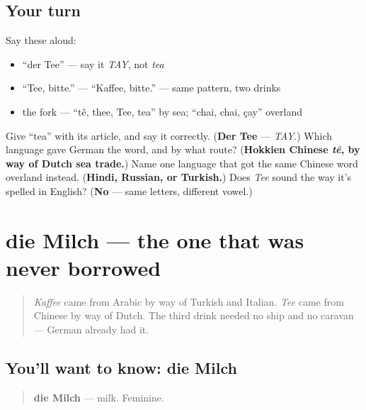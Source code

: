 \subsection*{Your turn}
Say these aloud:

\begin{itemize}
\raggedright
  \item \textquotedblleft{}der Tee\textquotedblright{} — say it \emph{TAY}, not \emph{tea}
  \item \textquotedblleft{}Tee, bitte.\textquotedblright{} — \textquotedblleft{}Kaffee, bitte.\textquotedblright{} — same pattern, two drinks
  \item the fork — \textquotedblleft{}tê, thee, Tee, tea\textquotedblright{} by sea; \textquotedblleft{}chai, chai, çay\textquotedblright{} overland
\end{itemize}

\begin{tcolorbox}[breakable,colback=teal!4,colframe=teal!35!black,title={Before you move on}]
Give \textquotedblleft{}tea\textquotedblright{} with its article, and say it correctly. (\textbf{Der Tee} — \emph{TAY}.) Which language gave German the word, and by what route? (\textbf{Hokkien Chinese \emph{tê}, by way of Dutch sea trade.}) Name one language that got the same Chinese word overland instead. (\textbf{Hindi, Russian, or Turkish.}) Does \emph{Tee} sound the way it's spelled in English? (\textbf{No} — same letters, different vowel.)
\end{tcolorbox}
\section[die Milch]{die Milch — the one that was never borrowed}

\label{lesson:GE-C28-milch}



\begin{quote}
\emph{Kaffee} came from Arabic by way of Turkish and Italian. \emph{Tee} came from Chinese by way of Dutch. The third drink needed no ship and no caravan — German already had it.
\end{quote}

\subsection*{You'll want to know: die Milch}
\begin{quote}
\textbf{die Milch} — milk. Feminine.
\end{quote}

